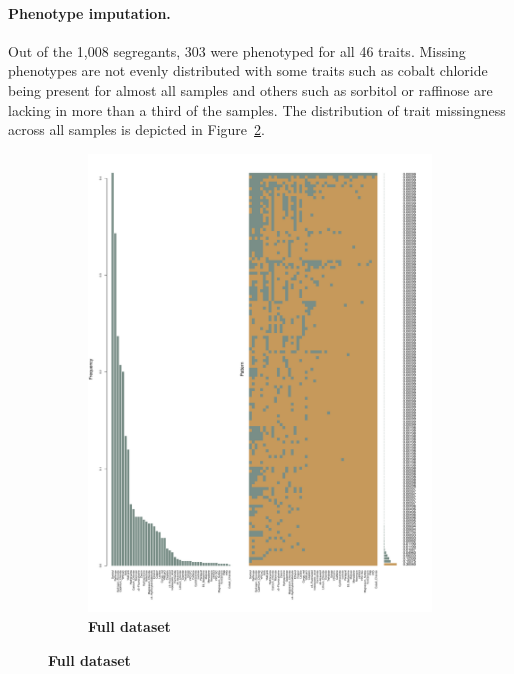\paragraph{Phenotype imputation. } Out of the 1,008 segregants, 303 were phenotyped for all 46 traits. Missing phenotypes are not evenly distributed with some traits such as cobalt chloride being present for almost all samples and others such as sorbitol or raffinose are lacking in more than a third of the samples. The distribution of trait missingness across all samples is depicted in Figure~\ref{fig:missingness-all}. 

\begin{figure}[!h]
	\centering
	\begin{subfigure}[b]{0.48\textwidth}
		\center
	\includegraphics[trim = 0mm 0mm 20mm 2mm, clip, scale=0.2]{Chapter1/Figures/20170124_missing_data_pattern.pdf}
	\caption{\textbf{Full dataset}}
 		\label{fig:missingness-all}

\end{subfigure}
\end{figure}
